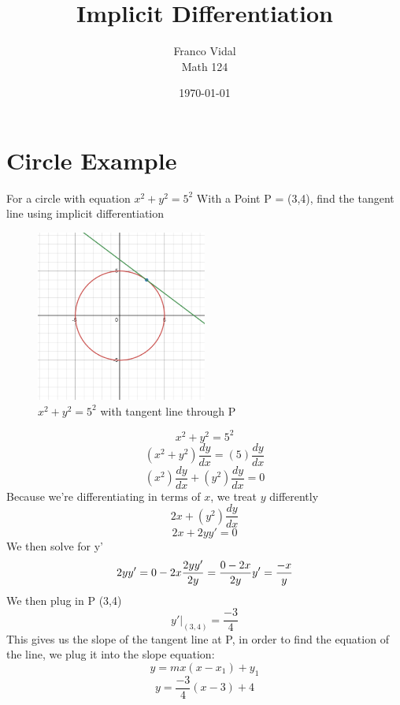 \documentclass{article}
\title{Implicit Differentiation}
\author{Franco Vidal \\ Math 124}
\date{\today}
\begin{document}
\maketitle
\section{Circle Example}
For a circle with equation $x^2 + y^2=5^2$ With a Point P = (3,4), find the tangent line using implicit differentiation 
\begin{figure}[h]
\caption{$x^2 + y^2 = 5^2$ with tangent line through P}
\centering
\includegraphics[width=0.5\textwidth]{Circle1.png}
\end{figure}
\begin{equation}
x^2 + y^2 = 5^2
\end{equation}
\begin{equation}
(x^2 + y^2)\frac{dy}{dx} = (5) \frac{dy}{dx}
\end{equation}
\begin{equation}
(x^2)\frac{dy}{dx} + (y^2)\frac{dy}{dx} = 0
\end{equation}
Because we're differentiating in terms of $x$, we treat $y$ differently
\begin{equation}
2x + (y^2)\frac{dy}{dx}
\end{equation}
\begin{equation}
2x + 2yy' = 0
\end{equation}
We then solve for y'
\begin{equation}
2yy' = 0 - 2x
\\\frac{2yy'}{2y}=\frac{0-2x}{2y}
\\y' = \frac{-x}{y}
\end{equation}
We then plug in P (3,4)
\begin{equation}
y'|_{(3,4)} = \frac{-3}{4} 
\end{equation}
This gives us the slope of the tangent line at P, in order to find the equation of the line, we plug it into the slope equation:
\begin{equation}
y = mx(x-x_1)+y_1
\end{equation}
\begin{equation}
y = \frac{-3}{4}(x - 3)+4
\end{equation}
\end{document}
